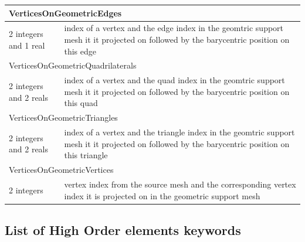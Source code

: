 \documentclass[a4paper,12pt]{article}
\begin{document}
\begin{longtable}{|m{4cm}|m{11cm}|}
\multicolumn{2}{|l|}{VerticesOnGeometricEdges} \\
\hline
2 integers and 1 real & index of a vertex and the edge index in the geomtric support mesh it it projected on followed by the barycentric position on this edge \\
\hline\hline

\multicolumn{2}{|l|}{VerticesOnGeometricQuadrilaterals} \\
\hline
2 integers and 2 reals & index of a vertex and the quad index in the geomtric support mesh it it projected on followed by the barycentric position on this quad \\
\hline\hline

\multicolumn{2}{|l|}{VerticesOnGeometricTriangles} \\
\hline
2 integers and 2 reals & index of a vertex and the triangle index in the geomtric support mesh it it projected on followed by the barycentric position on this triangle \\
\hline\hline

\multicolumn{2}{|l|}{VerticesOnGeometricVertices} \\
\hline
2 integers & vertex index from the source mesh and the corresponding vertex index it is projected on in the geometric support mesh \\
\hline\hline

\end{longtable}



\subsection{List of High Order elements keywords}
\end{document}
